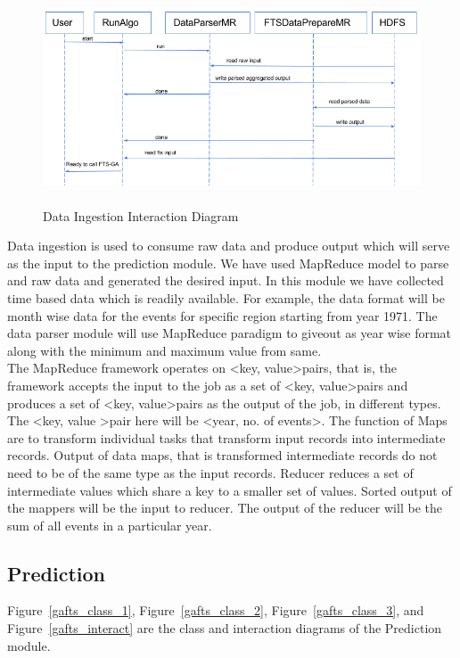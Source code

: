 \documentclass[12pt,journal,compsoc]{IEEEtran}
\begin{document}
\begin{figure}
\includegraphics[height=2.5in,width=6.5in]{dp_interact}
\caption{Data Ingestion Interaction Diagram}
\label{dp_interact}
\end{figure}
\indent Data ingestion is used to consume raw data and produce output which will serve as the input to the prediction module. We have used MapReduce model to parse and raw data and generated the desired input. In this module we have collected time based data which is readily available. For example, the data format will be month wise data for the events for specific region starting from year 1971. The data parser module will use MapReduce paradigm to giveout as year wise format along with the minimum and maximum value from same.
\\\indent The MapReduce framework operates on \textless key, value\textgreater  pairs, that is, the framework accepts the input to the job as a set of \textless key, value\textgreater  pairs and produces a set of \textless key, value\textgreater  pairs as the output of the job, in different types. The \textless  key, value \textgreater  pair here will be \textless year, no. of events\textgreater . The function of Maps are to transform individual tasks that transform input records into intermediate records. Output of data maps, that is transformed intermediate records do not need to be of the same type as the input records. Reducer reduces a set of intermediate values which share a key to a smaller set of values. Sorted output of the mappers will be the input to reducer. The output of the reducer will be the sum of all events in a particular year.

\subsection{Prediction}
\indent Figure~\ref{gafts_class_1}, Figure~\ref{gafts_class_2}, Figure~\ref{gafts_class_3}, and Figure~\ref{gafts_interact} are the class and interaction diagrams of the Prediction module.
\end{document}
